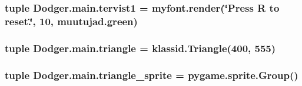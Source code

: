 \subsubsection[{tervist1}]{\setlength{\rightskip}{0pt plus 5cm}tuple Dodger.\+main.\+tervist1 = myfont.\+render(\char`\"{}Press R to reset.\char`\"{}, 10, muutujad.\+green)}\label{namespace_dodger_1_1main_ab3023da733d7bcce7908efc9e646a3d1}
\hypertarget{namespace_dodger_1_1main_a5c27661b1b9c13624a07f3757a3bd88a}{}
\subsubsection[{triangle}]{\setlength{\rightskip}{0pt plus 5cm}tuple Dodger.\+main.\+triangle = {\bf klassid.\+Triangle}(400, 555)}\label{namespace_dodger_1_1main_a5c27661b1b9c13624a07f3757a3bd88a}
\hypertarget{namespace_dodger_1_1main_a4794605b0906db6c42412957da8c5913}{}
\subsubsection[{triangle\+\_\+sprite}]{\setlength{\rightskip}{0pt plus 5cm}tuple Dodger.\+main.\+triangle\+\_\+sprite = pygame.\+sprite.\+Group()}\label{namespace_dodger_1_1main_a4794605b0906db6c42412957da8c5913}
